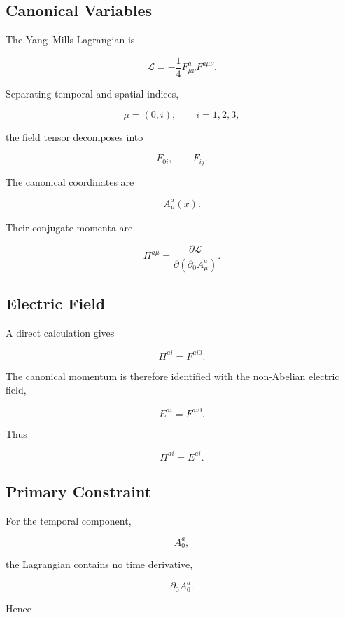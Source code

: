 
\subsection{Canonical Variables}

The Yang--Mills Lagrangian is

\[
\mathcal L
=
-\frac14
F_{\mu\nu}^a
F^{a\mu\nu}.
\]

Separating temporal and spatial indices,

\[
\mu=(0,i),
\qquad
i=1,2,3,
\]

the field tensor decomposes into

\[
F_{0i},
\qquad
F_{ij}.
\]

The canonical coordinates are

\[
A_\mu^a(x).
\]

Their conjugate momenta are

\[
\boxed{
\Pi^{a\mu}
=
\frac{\partial\mathcal L}
{\partial(\partial_0A_\mu^a)}.
}
\]


\subsection{Electric Field}

A direct calculation gives

\[
\boxed{
\Pi^{ai}
=
F^{ai0}.
}
\]

The canonical momentum is therefore identified with the non-Abelian
electric field,

\[
E^{ai}
=
F^{ai0}.
\]

Thus

\[
\boxed{
\Pi^{ai}
=
E^{ai}.
}
\]


\subsection{Primary Constraint}

For the temporal component,

\[
A_0^a,
\]

the Lagrangian contains no time derivative,

\[
\partial_0A_0^a.
\]

Hence

